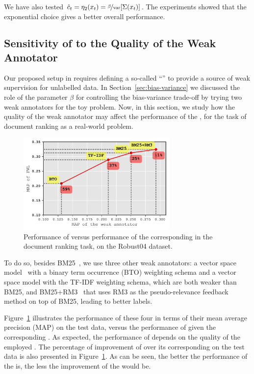 We have also tested $\hat{c}_t = \eta_2(x_t) = \nicefrac{\beta}{\rm var}[\Sigma(x_t)]$.  The experiments showed that the exponential choice gives a better overall performance. 


\subsection{Sensitivity of \fwl to the Quality of the Weak Annotator}
Our proposed setup in \fwl requires defining a so-called ``\wa'' to provide a source of weak supervision for unlabelled data. In Section~\ref{sec:bias-variance} we discussed the role of the parameter $\beta$ for controlling the bias-variance trade-off by trying two weak annotators for the toy problem. 
Now, in this section, we study how the quality of the weak annotator may affect the performance of the \fwl, for the task of document ranking as a real-world problem.

\begin{figure}[t]
    \centering
    \includegraphics[width=0.7\textwidth]{03-part-02/chapter-05/figs_and_tables/plot_sensitivity_fwl.png}
    \caption{Performance of \fwl versus performance of the corresponding \wa in the document ranking task, on the Robust04 dataset.}
    \label{fig:sensitivity}
\end{figure}
To do so, besides BM25~\citep{Robertson:2009}, we use three other weak annotators: 
a vector space model~\citep{salton1973specification} with a binary term occurrence (BTO) weighting schema and a vector space model with the TF-IDF weighting schema, which are both weaker than BM25, and BM25+RM3~\citep{Abdul-jaleel:2004} that uses RM3 as the pseudo-relevance feedback method on top of BM25, leading to better labels. 

Figure~\ref{fig:sensitivity} illustrates the performance of these four \was in terms of their mean average precision (MAP) on the test data, versus the performance of \fwl given the corresponding \wa. As expected, the performance of \fwl depends on the quality of the employed \wa.
The percentage of improvement of \fwl over its corresponding \wa on the test data is also presented in Figure~\ref{fig:sensitivity}. As can be seen, the better the performance of the \wa is, the less the improvement of the \fwl would be. 


